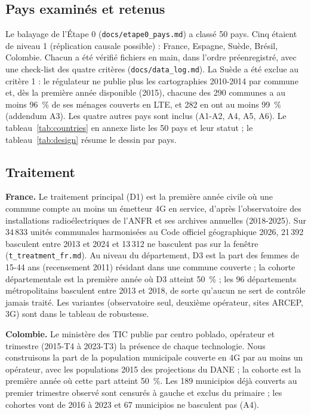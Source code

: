 \documentclass[11pt,a4paper]{article}
\begin{document}
\subsection{Pays examinés et retenus}

Le balayage de l'Étape 0 (\texttt{docs/etape0\_pays.md}) a classé 50 pays. Cinq étaient de niveau 1 (réplication causale possible) : France, Espagne, Suède, Brésil, Colombie. Chacun a été vérifié fichiers en main, dans l'ordre préenregistré, avec une check-list des quatre critères (\texttt{docs/data\_log.md}). La Suède a été exclue au critère 1 : le régulateur ne publie plus les cartographies 2010-2014 par commune et, dès la première année disponible (2015), chacune des 290 communes a au moins 96~\% de ses ménages couverts en LTE, et 282 en ont au moins 99~\% (addendum A3). Les quatre autres pays sont inclus (A1-A2, A4, A5, A6). Le tableau~\ref{tab:countries} en annexe liste les 50 pays et leur statut ; le tableau~\ref{tab:design} résume le dessin par pays.



\subsection{Traitement}

\textbf{France.} Le traitement principal (D1) est la première année civile où une commune compte au moins un émetteur 4G en service, d'après l'observatoire des installations radioélectriques de l'ANFR et ses archives annuelles (2018-2025). Sur 34\,833 unités communales harmonisées au Code officiel géographique 2026, 21\,392 basculent entre 2013 et 2024 et 13\,312 ne basculent pas sur la fenêtre (\texttt{t\_treatment\_fr.md}). Au niveau du département, D3 est la part des femmes de 15-44 ans (recensement 2011) résidant dans une commune couverte ; la cohorte départementale est la première année où D3 atteint 50~\% ; les 96 départements métropolitains basculent entre 2013 et 2018, de sorte qu'aucun ne sert de contrôle jamais traité. Les variantes (observatoire seul, deuxième opérateur, sites ARCEP, 3G) sont dans le tableau de robustesse.

\textbf{Colombie.} Le ministère des TIC publie par centro poblado, opérateur et trimestre (2015-T4 à 2023-T3) la présence de chaque technologie. Nous construisons la part de la population municipale couverte en 4G par au moins un opérateur, avec les populations 2015 des projections du DANE ; la cohorte est la première année où cette part atteint 50~\%. Les 189 municipios déjà couverts au premier trimestre observé sont censurés à gauche et exclus du primaire ; les cohortes vont de 2016 à 2023 et 67 municipios ne basculent pas (A4).
\end{document}

